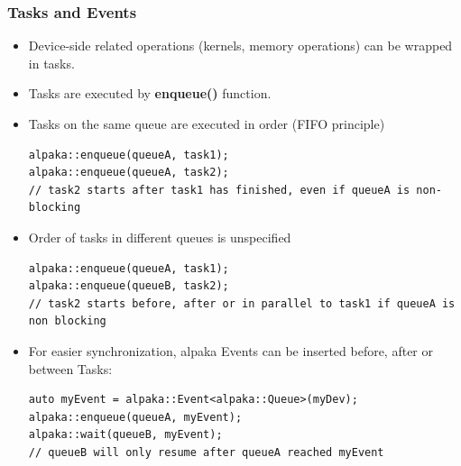 \documentclass[9pt]{beamer}
\begin{document}
\begin{frame}[fragile]
\frametitle{Tasks and Events}

\begin{itemize}
\item Device-side related operations  (kernels, memory operations) can be wrapped in tasks.
\item Tasks are executed by \textbf{enqueue()} function.
\item Tasks on the same queue are executed in order (FIFO principle)
\begin{lstlisting}
alpaka::enqueue(queueA, task1);
alpaka::enqueue(queueA, task2);
// task2 starts after task1 has finished, even if queueA is non-blocking
\end{lstlisting}
\item Order of tasks in different queues is unspecified
\begin{lstlisting}
alpaka::enqueue(queueA, task1);
alpaka::enqueue(queueB, task2);
// task2 starts before, after or in parallel to task1 if queueA is non blocking
\end{lstlisting}
\item For easier synchronization, alpaka Events can be inserted before, after or between Tasks:
\begin{lstlisting}
auto myEvent = alpaka::Event<alpaka::Queue>(myDev);
alpaka::enqueue(queueA, myEvent);
alpaka::wait(queueB, myEvent);
// queueB will only resume after queueA reached myEvent
\end{lstlisting}
\end{itemize}
\end{frame}
\end{document}
